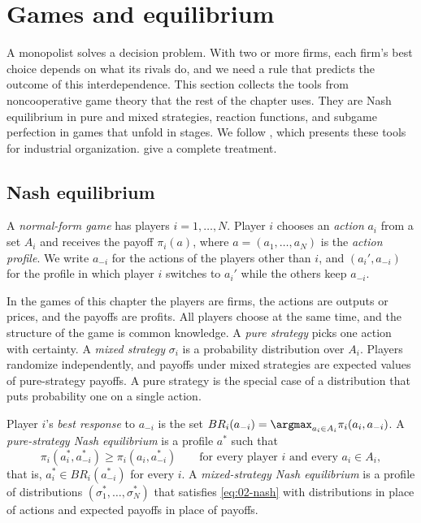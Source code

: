 \section{Games and equilibrium}\label{sec:02-games}

A monopolist solves a decision problem. With two or more firms, each firm's best choice depends on what its rivals
do, and we need a rule that predicts the outcome of this interdependence. This section collects the tools from
noncooperative game theory that the rest of the chapter uses. They are Nash equilibrium in pure and mixed
strategies, reaction functions, and subgame perfection in games that unfold in stages. We follow
\citet[ch.~11 and the introduction to Part~II]{Tirole1988}, which presents these tools for industrial organization.
\citet{FudenbergTirole1991} give a complete treatment.

\subsection{Nash equilibrium}\label{sec:02-nash}

\begin{definition}\label{def:02-game}
A \emph{normal-form game} has players $i = 1, \dots, N$. Player $i$ chooses an \emph{action} $a_i$ from a set $A_i$
and receives the payoff $\pi_i(a)$, where $a = (a_1, \dots, a_N)$ is the \emph{action profile}. We write $a_{-i}$
for the actions of the players other than $i$, and $(a_i', a_{-i})$ for the profile in which player $i$ switches to
$a_i'$ while the others keep $a_{-i}$.
\end{definition}

In the games of this chapter the players are firms, the actions are outputs or prices, and the payoffs are profits.
All players choose at the same time, and the structure of the game is common knowledge. A \emph{pure strategy}
picks one action with certainty. A \emph{mixed strategy} $\sigma_i$ is a probability distribution over $A_i$.
Players randomize independently, and payoffs under mixed strategies are expected values of pure-strategy payoffs. A
pure strategy is the special case of a distribution that puts probability one on a single action.

\begin{definition}\label{def:02-nash}
Player $i$'s \emph{best response} to $a_{-i}$ is the set $BR_i(a_{-i}) = \argmax_{a_i \in A_i}\pi_i(a_i, a_{-i})$.
A \emph{pure-strategy Nash equilibrium} is a profile $a^*$ such that
\begin{equation}\label{eq:02-nash}
  \pi_i(a_i^*, a_{-i}^*) \ge \pi_i(a_i, a_{-i}^*) \qquad \text{for every player } i \text{ and every } a_i \in A_i ,
\end{equation}
that is, $a_i^* \in BR_i(a_{-i}^*)$ for every $i$. A \emph{mixed-strategy Nash equilibrium} is a profile of
distributions $(\sigma_1^*, \dots, \sigma_N^*)$ that satisfies \eqref{eq:02-nash} with distributions in place of
actions and expected payoffs in place of payoffs.
\end{definition}


